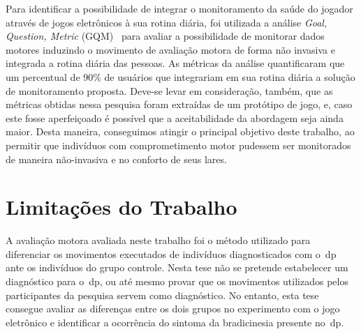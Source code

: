 Para identificar a possibilidade de integrar o monitoramento da saúde do jogador através de jogos eletrônicos à sua rotina diária, foi utilizada a análise \textit{Goal, Question, Metric} (GQM)~\cite{basili94} para avaliar a possibilidade de monitorar dados motores induzindo o movimento de avaliação motora de forma não invasiva e integrada a rotina diária das pessoas. As métricas da análise quantificaram que um percentual de 90\% de usuários que integrariam em sua rotina diária a solução de monitoramento proposta. Deve-se levar em consideração, também, que as métricas obtidas nessa pesquisa foram extraídas de um protótipo de jogo, e, caso este fosse aperfeiçoado é possível que a aceitabilidade da abordagem seja ainda maior. Desta maneira, conseguimos atingir o principal objetivo deste trabalho, ao permitir que indivíduos com comprometimento motor pudessem ser monitorados de maneira não-invasiva e no conforto de seus lares.






\section{Limitações do Trabalho}\label{section:limitacoes}
A avaliação motora avaliada neste trabalho foi o método utilizado para diferenciar os movimentos executados de indivíduos diagnosticados com o~\ac{dp} ante os indivíduos do grupo controle. Nesta tese não se pretende estabelecer um diagnóstico para o~\ac{dp}, ou até mesmo provar que os movimentos utilizados pelos participantes da pesquisa servem como diagnóstico. No entanto, esta tese consegue avaliar as diferenças entre os dois grupos no experimento com o jogo eletrônico e identificar a ocorrência do sintoma da bradicinesia presente no~\ac{dp}.

